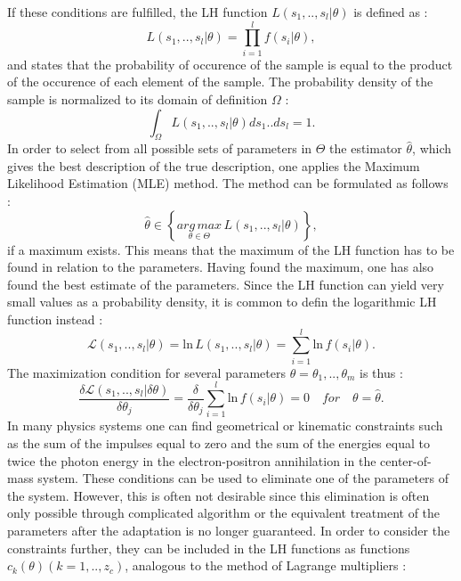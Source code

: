 If these conditions are fulfilled, the LH function $L\left(s_1,..,s_l|\theta \right)$ is defined as :
%
\begin{equation}
  L\left(s_1,..,s_l|\theta \right) = \prod_{i=1}^{l} f(s_i|\theta),
\end{equation}
%
and states that the probability of occurence of the sample is equal to the product of the occurence of each element of the sample. The probability density of the sample is normalized to its domain of definition $\Omega$ :
%
\begin{equation}
  \int_{\Omega} L\left(s_1,..,s_l|\theta \right) ds_1 .. ds_l = 1.
\end{equation}
%
In order to select from all possible sets of parameters in $\Theta$ the estimator $\hat{\theta}$, which gives the best description of the true description, one applies the Maximum Likelihood Estimation (MLE) method. The method can be formulated as follows :
%
\begin{equation}
  \hat{\theta} \in \left \{ \underset{\theta \in \Theta}{arg\,max}\,L\left(s_1,..,s_l|\theta \right) \right \},
\end{equation}
%
if a maximum exists. This means that the maximum of the LH function has to be found in relation to the parameters. Having found the maximum, one has also found the best estimate of the parameters. Since the LH function can yield very small values as a probability density, it is common to defin the logarithmic LH function instead :
%
\begin{equation}
  \mathscr{L}\left(s_1,..,s_l|\theta \right) = \text{ln}\,L\left(s_1,..,s_l|\theta \right) = \sum_{i=1}^{l} \text{ln}\,f(s_i|\theta).
\end{equation}
%
The maximization condition for several parameters $\theta = \theta_1,..,\theta_m$ is thus :
%
\begin{equation}\label{eq:maximization}
  \frac{\delta \mathscr{L}\left(s_1,..,s_l|\delta\theta \right)}{\delta\theta_j} = \frac{\delta}{\delta\theta_j} \sum_{i=1}^{l} \text{ln}\,f(s_i|\theta) = 0 \quad for \quad \theta = \hat{\theta}.
\end{equation}
%
In many physics systems one can find geometrical or kinematic constraints such as the sum of the impulses equal to zero and the sum of the energies equal to twice the photon energy in the electron-positron annihilation in the center-of-mass system. These conditions can be used to eliminate one of the parameters of the system. However, this is often not desirable since this elimination is often only possible through complicated algorithm or the equivalent treatment of the parameters after the adaptation is no longer guaranteed. In order to consider the constraints further, they can be included in the LH functions as functions $c_{k}(\theta)(k=1,..,z_c)$, analogous to the method of Lagrange multipliers :
